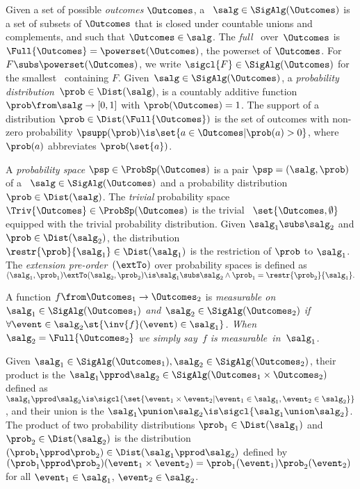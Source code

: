 \documentclass[acmsmall,nonacm,screen,appendix]{acmart}
\begin{document}
\begin{definition}
\label{def:prob-sp}
  Given a set of possible \emph{outcomes} $\Outcomes$,
  a \salgebra\ $ \salg \in \SigAlg(\Outcomes) $ is
  a set of subsets of $\Outcomes$
    that is closed under countable unions and
    complements, and such that
    $\Outcomes \in \salg$.
  The \emph{full} \salgebra\ over~$\Outcomes$ is
  $ \Full{\Outcomes} = \powerset(\Outcomes) $,
		the powerset of $\Outcomes$.
  For $F \subs \powerset(\Outcomes)$, we write $\sigcl{F} \in \SigAlg(\Outcomes)$
    for the smallest \salgebra\ containing $F$.
Given~$\salg \in \SigAlg(\Outcomes)$,
  a \emph{probability distribution}~$\prob \in \Dist(\salg)$,
    is a countably additive function~$ \prob \from \salg \to [0,1] $
    with $\prob(\Outcomes)=1$.
  The support of a distribution $\prob \in \Dist(\Full{\Outcomes})$
  is the set of outcomes with non-zero probability
  $ \psupp(\prob) \is \set{ a \in \Outcomes | \prob(a) > 0 } $,
  where $\prob(a)$ abbreviates $\prob(\set{a})$.

  A \emph{probability space} $ \psp \in \ProbSp(\Outcomes) $ is
  a pair $ \psp = (\salg, \prob) $ of
    a \salgebra\ $\salg \in \SigAlg(\Outcomes)$ and
    a probability distribution~$\prob \in \Dist(\salg)$.
The \emph{trivial} probability space $\Triv{\Outcomes} \in \ProbSp(\Outcomes)$
  is the trivial \salgebra\ $ \set{\Outcomes,\emptyset} $
  equipped with the trivial probability distribution.
Given $\salg_1 \subs \salg_2$ and $\prob \in \Dist(\salg_2)$,
  the distribution $ \restr{\prob}{\salg_1} \in \Dist(\salg_1) $
  is the restriction of $\prob$ to $\salg_1$.
The \emph{extension pre-order}~$(\extTo)$ over probability spaces is defined as
  $
    (\salg_1, \prob_1) \extTo (\salg_2, \prob_2) \is
      \salg_1 \subs \salg_2 \land \prob_1 = \restr{\prob_2}{\salg_1}.
  $

  A function $f \from \Outcomes_1 \to \Outcomes_2$ is
  \em{measurable} on
  $ \salg_1\in\SigAlg(\Outcomes_1)$ and $\salg_2\in\SigAlg(\Outcomes_2) $
  if\/
  $ \forall \event \in \salg_2 \st {\inv{f}(\event) \in \salg_1} $.
When $\salg_2 = \Full{\Outcomes_2}$
	we simply say~$f$ is measurable~in~$\salg_1$.
\end{definition}

\begin{definition}
\label{def:prod-union-sp}
  Given $ \salg_1 \in \SigAlg(\Outcomes_1),\salg_2 \in \SigAlg(\Outcomes_2) $,
  their product is the \salgebra{}
  $ \salg_1 \pprod \salg_2 \in \SigAlg(\Outcomes_1 \times \Outcomes_2) $
  defined as
  $ \salg_1 \pprod \salg_2 \is \sigcl{\set{\event_1 \times \event_2 | \event_1 \in \salg_1, \event_2 \in \salg_2}} $,
  and their union is the \salgebra{}
  $ \salg_1 \punion \salg_2 \is \sigcl{\salg_1 \union \salg_2} $.
The product of two probability distributions
  $ \prob_1 \in \Dist(\salg_1) $ and
  $ \prob_2 \in \Dist(\salg_2) $ is
  the distribution
  $ (\prob_1 \pprod \prob_2) \in \Dist(\salg_1 \pprod \salg_2) $
  defined by
  $ (\prob_1 \pprod \prob_2)(\event_1 \times \event_2) = \prob_1(\event_1)\prob_2(\event_2) $
  for all $\event_1 \in \salg_1$, $\event_2 \in \salg_2$.
\end{definition}
\end{document}
